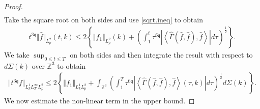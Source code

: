 \documentclass[reqno]{amsart}
\newcommand{\pv}{p}
\def\norm#1{\big\Vert#1\big\Vert}
\newcommand{\irnp}[2]{\left\langle {#1},{#2} \right\rangle}
\newcommand{\qq}{\mathfrak{q}}
\newcommand{\tTq}{t^{3\qq}}
\newcommand{\Z}{\mathbb{Z}}
\theoremstyle{definition}
\numberwithin{equation}{section}
\numberwithin{theorem}{section}
\begin{document}
\begin{proof}
\begin{align}
\end{align}
Take the square root on both sides and use \eqref{sqrt.ineq} to obtain
\begin{align*}
 \tTq \Vert \hat{f}\Vert_{L^2_{\pv}}(t,k)
\leq 
2\left\{ \Vert \hat{f}_1\Vert_{L^2_{\pv}}(k) 
+
\left(\int^t_1 \tau^{6\qq} \left|{\irnp{\hat{\Gamma}(\hat{f},\hat{f})}{\hat{f}}}\right|
d\tau \right)^{\frac12}
\right\}.  
\end{align*}
We take  $\sup_{0\le t\le T}$ on both sides and then integrate the result with respect to $d\Sigma(k)$ over $\Z^3$ to obtain
\begin{align*}
{\norm{t^{3\qq} f}_{L^1_kL^\infty_TL^2_{\pv}}}
\leq 
2\left\{ \norm{f_1}_{L^1_kL^2_{\pv}}
+
\int_{\Z^3} \left(\int^T_1 \tau^{6\qq} \left|{\irnp{\hat{\Gamma}(\hat{f},\hat{f})}{\hat{f}}}(\tau,k)\right|
d\tau \right)^{\frac12} d\Sigma(k)
\right\}.  
\end{align*}
We now estimate the non-linear term in the upper bound.  




\end{proof}
\end{document}
